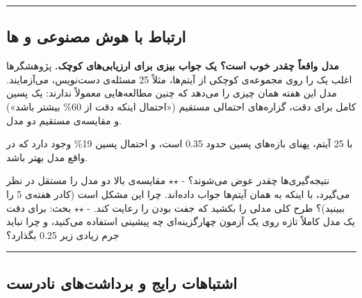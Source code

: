 \begin{center}\rule{0.5\linewidth}{0.5pt}\end{center}

\subsection{\texorpdfstring{ارتباط با هوش مصنوعی و
ها}{ارتباط با هوش مصنوعی و LLMها}}

\textbf{مدل واقعاً چقدر خوب است؟ یک جواب بیزی برای ارزیابی‌های کوچک.}
پژوهشگرها اغلب یک  را روی مجموعه‌ی کوچکی از آیتم‌ها، مثلاً 25
مسئله‌ی دست‌نویس، می‌آزمایند. مدل  این هفته همان چیزی را
می‌دهد که چنین مطالعه‌هایی معمولاً ندارند: یک پسین کامل برای دقت، گزاره‌های
احتمالی مستقیم («احتمال اینکه دقت از 60\% بیشتر باشد») و مقایسه‌ی مستقیم
دو مدل.

با 25 آیتم، پهنای بازه‌های پسین حدود 0.35 است، و احتمال پسین 19\% وجود
دارد که در واقع  مدل بهتر باشد.

نتیجه‌گیری‌ها چقدر عوض می‌شوند؟ - \ensuremath{\star}\ensuremath{\star} مقایسه‌ی بالا دو مدل را مستقل در نظر
می‌گیرد، با اینکه به همان آیتم‌ها جواب داده‌اند. چرا این مشکل است (کادر
هفته‌ی 5 را ببینید)؟ طرح کلی مدلی را بکشید که جفت بودن را رعایت کند. - \ensuremath{\star}\ensuremath{\star}
بحث: برای دقت یک مدل کاملاً تازه روی یک آزمون چهارگزینه‌ای چه پیشینی
استفاده می‌کنید، و چرا نباید جرم زیادی زیر 0.25 بگذارد؟

\begin{center}\rule{0.5\linewidth}{0.5pt}\end{center}

\subsection{اشتباهات رایج و برداشت‌های نادرست}

